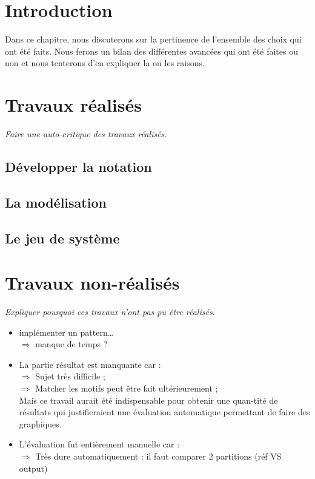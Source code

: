 \section*{Introduction}
Dans ce chapitre, nous discuterons sur la pertinence de l’ensemble des choix qui ont été faits. Nous ferons un bilan des différentes avancées qui ont été faites ou non et nous tenterons d’en expliquer la ou les raisons.
\section{Travaux réalisés}
\textit{Faire une auto-critique des travaux réalisés.}
\subsection{Développer la notation}
\subsection{La modélisation}
\subsection{Le jeu de système}

\section{Travaux non-réalisés}
\textit{Expliquer pourquoi ces travaux n’ont pas pu être réalisés.}
\begin{itemize}
	\item implémenter un pattern…\\
	$\Rightarrow$ manque de temps ?\\
	\item La partie résultat est manquante car :\\
	$\Rightarrow$ Sujet très difficile ;\\
	$\Rightarrow$ Matcher les motifs peut être fait ultérieurement ;\\
	\tab Mais ce travail aurait été indispensable pour obtenir une quan-\tab tité de résultats qui justifieraient une évaluation automatique \tab permettant de faire des graphiques.\\
	\item L’évaluation fut entièrement manuelle car :\\
	$\Rightarrow$ Très dure automatiquement : il faut comparer 2 partitions (réf \tab VS output)
\end{itemize}
